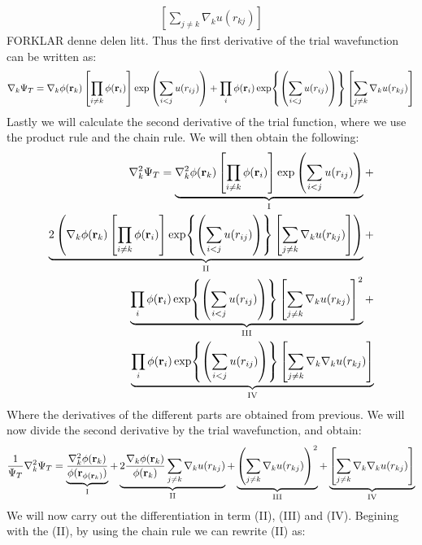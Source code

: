 \documentclass[a4paper, 10pt]{article}
\begin{document}
\begin{appendices}
\begin{align}
		\left[\sum_{j \neq k}\nabla_{k}u(r_{kj})\right]
		\end{align}
		FORKLAR denne delen litt. Thus the first derivative of the trial wavefunction
		can be written as:
		\begin{align}
		\nabla_{k}\Psi_{T} =
		\nabla_k \phi(\mathbf{r}_k)\left[ \prod_{i\neq k} \phi(\mathbf{r}_i)\right]\exp\left(\sum_{i<j}u(r_{ij})\right)
		+ \prod_{i}\phi(\bold{r}_{i})
		\exp{\left(\sum_{i<j}u(r_{ij})\right)}
		\left[\sum_{j \neq k}\nabla_{k}u(r_{kj})\right]
		\end{align}
		Lastly we will calculate the second derivative of the trial function, where we
		use the product rule and the chain rule. We will then obtain the following:
		\begin{align*}
		\begin{split}
		\nabla_{k}^2\Psi_{T} =
		\underbrace{\nabla_k^2 \phi(\mathbf{r}_k)\left[ \prod_{i\neq k} \phi(\mathbf{r}_i)\right]\exp\left(\sum_{i<j}u(r_{ij})\right)}_{\mathrm{I}} +\\
		\underbrace{2\left(\nabla_k \phi(\mathbf{r}_k)\left[ \prod_{i\neq k} \phi(\mathbf{r}_i)\right]
			\exp{\left(\sum_{i<j}u(r_{ij})\right)}
			\left[\sum_{j \neq k}\nabla_{k}u(r_{kj})\right]\right)}_{\mathrm{II}} +
		\\
		\underbrace{\prod_{i}\phi(\bold{r}_{i})
			\exp{\left(\sum_{i<j}u(r_{ij})\right)}
			\left[\sum_{j \neq k}\nabla_{k}u(r_{kj})\right]^2}_{\mathrm{III}} +
		\\
		\underbrace{\prod_{i}\phi(\bold{r}_{i})
			\exp{\left(\sum_{i<j}u(r_{ij})\right)}
			\left[\sum_{j \neq k}\nabla_{k}\nabla_{k}u(r_{kj})\right]}_{\mathrm{IV}}
		\end{split}
		\end{align*}
		Where the derivatives of the different parts are obtained from previous.
		We will now divide the second derivative by the trial wavefunction, and obtain:
		\begin{align}
		\frac{1}{\Psi_{T}}\nabla_{k}^2\Psi_{T} =
		\underbrace{\frac{\nabla_{k}^2\phi{(\bold{r}_{k})}}{\phi(\bold{r}_{\phi(\bold{r}_{k})})}}_{\mathrm{I}}
		+ \underbrace{2\frac{\nabla_{k}\phi(\bold{r}_{k})}{\phi{(\bold{r}_{k})}}\sum_{j\neq k}\nabla_{k}u(r_{kj})}_{\mathrm{II}}
		+ \underbrace{\left(\sum_{j\neq k}\nabla_{k} u(r_{kj})\right)^2}_{\mathrm{III}} +
		\underbrace{\left[\sum_{j \neq k}\nabla_{k}\nabla_{k}u(r_{kj})\right]}_{\mathrm{IV}}
		\end{align}
		We will now carry out the differentiation in term (II), (III) and (IV). Begining with the
		(II), by using the chain rule we can rewrite (II) as:

\end{appendices}
\end{document}
